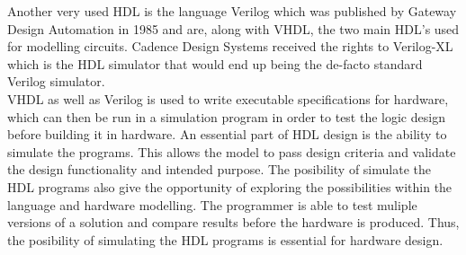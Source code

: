 



Another very used HDL is the language Verilog which was published by Gateway Design Automation in 1985 and are, along with VHDL, the two main HDL's used for modelling circuits. Cadence Design Systems received the rights to Verilog-XL which is the HDL simulator that would end up being the de-facto standard Verilog simulator. \\
VHDL as well as Verilog is used to write executable specifications for hardware, which can then be run in a simulation program in order to test the logic design before building it in hardware. An essential part of HDL design is the ability to simulate the programs. This allows the model to pass design criteria and validate the design functionality and intended purpose. The posibility of simulate the HDL programs also give the opportunity of exploring the possibilities within the language and hardware modelling. The programmer is able to test muliple versions of a solution and compare results before the hardware is produced. Thus, the posibility of simulating the HDL programs is essential for hardware design. \\






